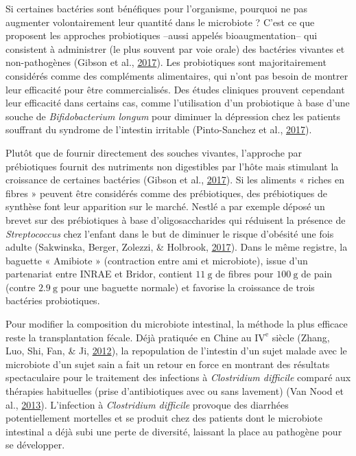 \documentclass[12pt,a4paper]{reedthesis}
\theoremstyle{definition}
\theoremstyle{definition}
\theoremstyle{definition}
\theoremstyle{remark}
\begin{document}
Si certaines bactéries sont bénéfiques pour l'organisme, pourquoi ne pas augmenter volontairement leur quantité dans le microbiote ? C'est ce que proposent les approches probiotiques --aussi appelés bioaugmentation-- qui consistent à administrer (le plus souvent par voie orale) des bactéries vivantes et non-pathogènes (Gibson et al., \protect\hyperlink{ref-gibson2017expert}{2017}). Les probiotiques sont majoritairement considérés comme des compléments alimentaires, qui n'ont pas besoin de montrer leur efficacité pour être commercialisés. Des études cliniques prouvent cependant leur efficacité dans certains cas, comme l'utilisation d'un probiotique à base d'une souche de \emph{Bifidobacterium longum} pour diminuer la dépression chez les patients souffrant du syndrome de l'intestin irritable (Pinto-Sanchez et al., \protect\hyperlink{ref-pinto2017probiotic}{2017}).

Plutôt que de fournir directement des souches vivantes, l'approche par prébiotiques fournit des nutriments non digestibles par l'hôte mais stimulant la croissance de certaines bactéries (Gibson et al., \protect\hyperlink{ref-gibson2017expert}{2017}). Si les aliments « riches en fibres » peuvent être considérés comme des prébiotiques, des prébiotiques de synthèse font leur apparition sur le marché. Nestlé a par exemple déposé un brevet sur des prébiotiques à base d'oligosaccharides qui réduisent la présence de \emph{Streptococcus} chez l'enfant dans le but de diminuer le risque d'obésité une fois adulte (Sakwinska, Berger, Zolezzi, \& Holbrook, \protect\hyperlink{ref-sakwinska2017prebiotics}{2017}). Dans le même registre, la baguette « Amibiote » (contraction entre ami et microbiote), issue d'un partenariat entre INRAE et Bridor, contient \(11~\text{g}\) de fibres pour \(100~\text{g}\) de pain (contre \(2.9~\text{g}\) pour une baguette normale) et favorise la croissance de trois bactéries probiotiques.

Pour modifier la composition du microbiote intestinal, la méthode la plus efficace reste la transplantation fécale. Déjà pratiquée en Chine au \(\text{IV}^{\text{e}}\) siècle (Zhang, Luo, Shi, Fan, \& Ji, \protect\hyperlink{ref-zhang2012should}{2012}), la repopulation de l'intestin d'un sujet malade avec le microbiote d'un sujet sain a fait un retour en force en montrant des résultats spectaculaire pour le traitement des infections à \emph{Clostridium difficile} comparé aux thérapies habituelles (prise d'antibiotiques avec ou sans lavement) (Van Nood et al., \protect\hyperlink{ref-nood2013duodenal}{2013}). L'infection à \emph{Clostridium difficile} provoque des diarrhées potentiellement mortelles et se produit chez des patients dont le microbiote intestinal a déjà subi une perte de diversité, laissant la place au pathogène pour se développer.
\end{document}
